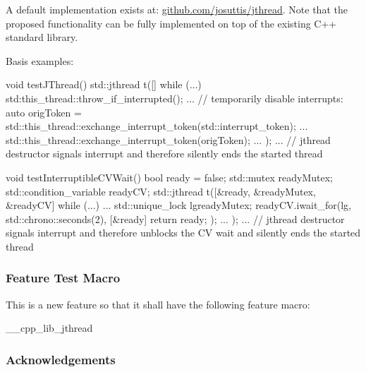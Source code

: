 A default implementation exists at:
\url{github.com/josuttis/jthread}.
Note that the proposed functionality can be fully implemented 
on top of the existing C++ standard library.

Basis examples:
\begin{codeblock}
void testJThread() 
{
  std::jthread t([] {
                   while (...) {
                     std:this_thread::throw_if_interrupted();
                     ...
                     // temporarily disable interrupts:
                     auto origToken = std::this_thread::exchange_interrupt_token(std::interrupt_token{});
                     ...
                     std::this_thread::exchange_interrupt_token(origToken);
                     ...
                   }
                 });
  ...
} // jthread destructor signals interrupt and therefore silently ends the started thread
\end{codeblock}

\begin{codeblock}
void testInterruptibleCVWait() 
{
  bool ready = false;
  std::mutex readyMutex;
  std::condition_variable readyCV;
  std::jthread t([&ready, &readyMutex, &readyCV] {
                    while (...) {
                      ...
                      {
                        std::unique_lock lg{readyMutex};
                        readyCV.iwait_for(lg,
                                          std::chrono::seconds(2),
                                          [&ready] {
                                             return ready;
                                          });
                      }
                      ...
                    }
                  });
  ...
} // jthread destructor signals interrupt and therefore unblocks the CV wait and silently ends the started thread
\end{codeblock}

\subsubsection*{Feature Test Macro}

This is a new feature so that it shall have the following feature macro:
\begin{codeblock}
	__cpp_lib_jthread
\end{codeblock}


\subsubsection*{Acknowledgements}

